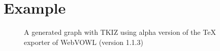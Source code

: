 \documentclass{article}
\begin{document}
 
\section{Example} 

\begin{figure} 
\caption{A generated graph with TKIZ using alpha version of the TeX exporter of WebVOWL (version 1.1.3) } 
\end{figure} 
\end{document}
